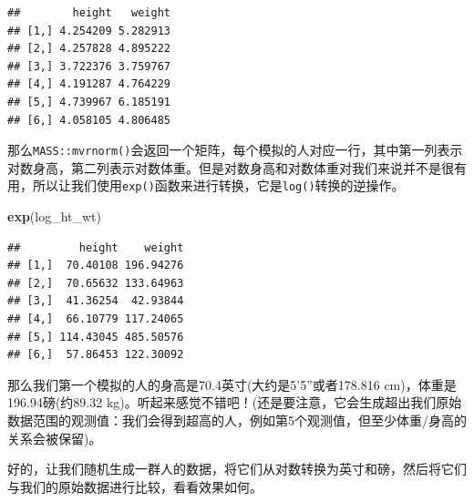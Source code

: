 \documentclass[
]{book}
\newenvironment{Shaded}{\begin{snugshade}}{\end{snugshade}}
\newcommand{\FunctionTok}[1]{\textcolor[rgb]{0.13,0.29,0.53}{\textbf{#1}}}
\newcommand{\NormalTok}[1]{#1}
\begin{document}
\begin{verbatim}
##        height   weight
## [1,] 4.254209 5.282913
## [2,] 4.257828 4.895222
## [3,] 3.722376 3.759767
## [4,] 4.191287 4.764229
## [5,] 4.739967 6.185191
## [6,] 4.058105 4.806485
\end{verbatim}

那么\texttt{MASS::mvrnorm()}会返回一个矩阵，每个模拟的人对应一行，其中第一列表示对数身高，第二列表示对数体重。但是对数身高和对数体重对我们来说并不是很有用，所以让我们使用\texttt{exp()}函数来进行转换，它是\texttt{log()}转换的逆操作。

\begin{Shaded}
\begin{Highlighting}[]
\FunctionTok{exp}\NormalTok{(log\_ht\_wt)}
\end{Highlighting}
\end{Shaded}

\begin{verbatim}
##         height    weight
## [1,]  70.40108 196.94276
## [2,]  70.65632 133.64963
## [3,]  41.36254  42.93844
## [4,]  66.10779 117.24065
## [5,] 114.43045 485.50576
## [6,]  57.86453 122.30092
\end{verbatim}

那么我们第一个模拟的人的身高是70.4英寸(大约是5'5''或者178.816 cm)，体重是196.94磅(约89.32 kg)。听起来感觉不错吧！(还是要注意，它会生成超出我们原始数据范围的观测值：我们会得到超高的人，例如第5个观测值，但至少体重/身高的关系会被保留)。

好的，让我们随机生成一群人的数据，将它们从对数转换为英寸和磅，然后将它们与我们的原始数据进行比较，看看效果如何。
\end{document}
